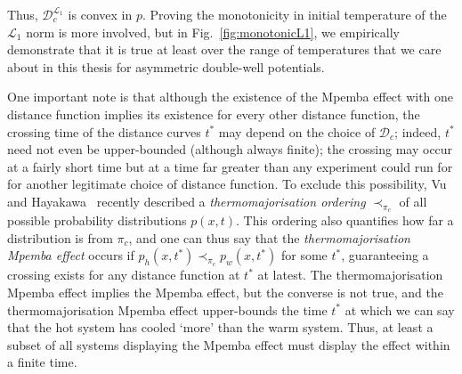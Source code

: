 \documentclass[hyperref={colorlinks=true, urlcolor=blue, citecolor=blue, final, bound}]{sfuthesis}
\begin{document}
Thus, $\mathcal D_c^{\mathcal L_1}$ is convex in $p$. Proving the monotonicity in initial temperature of the $\mathcal L_1$ norm is more involved, but in Fig.~\ref{fig:monotonicL1}, we empirically demonstrate that it is true at least over the range of temperatures that we care about in this thesis for asymmetric double-well potentials. 

One important note is that although the existence of the Mpemba effect with one distance function implies its existence for every other distance function, the crossing time of the distance curves $t^*$ may depend on the choice of $\mathcal D_c$; indeed, $t^*$ need not even be upper-bounded (although always finite); the crossing may occur at a fairly short time but at a time far greater than any experiment could run for for another legitimate choice of distance function. To exclude this possibility, Vu and Hayakawa~\cite{Vu2025} recently described a \textit{thermomajorisation ordering} $\prec_{\pi_c}$ of all possible probability distributions $p(x,t)$. This ordering also quantifies how far a distribution is from $\pi_c$, and one can thus say that the \textit{thermomajorisation Mpemba effect} occurs if $p_h(x,t^*) \prec_{\pi_c} p_w(x,t^*)$ for some $t^*$, guaranteeing a crossing exists for any distance function at $t^*$ at latest. The thermomajorisation Mpemba effect implies the Mpemba effect, but the converse is not true, and the thermomajorisation Mpemba effect upper-bounds the time $t^*$ at which we can say that the hot system has cooled `more' than the warm system. Thus, at least a subset of all systems displaying the Mpemba effect must display the effect within a finite time.
\end{document}
